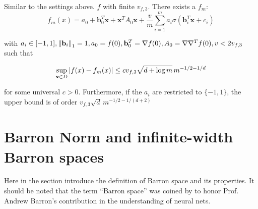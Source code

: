 \begin{theorem}
    Similar to the settings above. $f$ with finite $v_{f,3}$. There exists a
    $f_m$:
    \begin{equation}
        f_m(x) = a_0 + \mathbf{b}_0^T \mathbf{x} + \mathbf{x}^T A_0 \mathbf{x}+ \frac{v}{m} \sum_{i=1}^m a_i \sigma(\mathbf{b}_i^T\mathbf{x} + c_i)
    \end{equation}

    with $a_i \in [-1,1], \left\| \mathbf{b}_i \right\|_1 = 1, a_0 = f(0), \mathbf{b}_0^T
        = \nabla f(0), A_0 = \nabla\nabla^T f(0), v < 2v_{f,3}$ such that

    \begin{equation}
        \sup_{\mathbf{x} \in D} \left| f(x) - f_m(x) \right| \leq c v_{f,3} \sqrt{d+\log{m}} \, m^{-1/2-1/d}
    \end{equation}

    for some universal $c > 0$. Furthermore, if the $a_i$ are restricted to
    $\{-1, 1\}$, the upper bound is of order $v_{f,3} \sqrt{d} \,
        m^{-1/2-1/(d+2)}$
\end{theorem}




\newpage

\section{Barron Norm and infinite-width Barron spaces}
\label{sec:barron_norm}

Here in the section introduce the definition of Barron space and its properties.
It should be noted that the term ``Barron space'' was coined by
\cite{ePrioriEstimatesPopulation2019} to honor Prof. Andrew Barron's
contribution in the understanding of neural nets.

